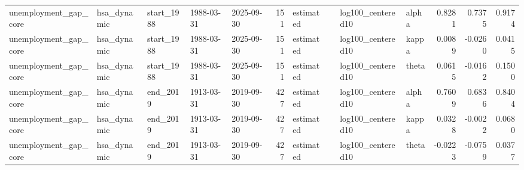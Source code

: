 \begin{tabular}{lllllrllllrrr}
unemployment\_gap\_core & hsa\_dynamic & start\_1988 & 1988-03-31 & 2025-09-30 & 151 & estimated &  & log100\_centered10 & alpha & 0.8281 & 0.7375 & 0.9174 \\
unemployment\_gap\_core & hsa\_dynamic & start\_1988 & 1988-03-31 & 2025-09-30 & 151 & estimated &  & log100\_centered10 & kappa & 0.0089 & -0.0260 & 0.0415 \\
unemployment\_gap\_core & hsa\_dynamic & start\_1988 & 1988-03-31 & 2025-09-30 & 151 & estimated &  & log100\_centered10 & theta & 0.0615 & -0.0162 & 0.1500 \\
unemployment\_gap\_core & hsa\_dynamic & end\_2019 & 1913-03-31 & 2019-09-30 & 427 & estimated &  & log100\_centered10 & alpha & 0.7609 & 0.6836 & 0.8404 \\
unemployment\_gap\_core & hsa\_dynamic & end\_2019 & 1913-03-31 & 2019-09-30 & 427 & estimated &  & log100\_centered10 & kappa & 0.0328 & -0.0022 & 0.0680 \\
unemployment\_gap\_core & hsa\_dynamic & end\_2019 & 1913-03-31 & 2019-09-30 & 427 & estimated &  & log100\_centered10 & theta & -0.0223 & -0.0759 & 0.0377 \\
\bottomrule
\end{tabular}
